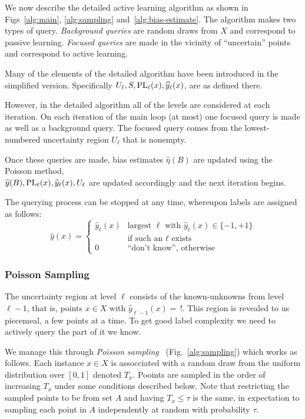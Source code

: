 \documentclass[twoside]{article}
\def\yh{{\widehat{y}}}
\def\PL{{\mbox{\rm PL}}}
\begin{document}
We now describe the detailed active learning algorithm as shown in
Figs~\ref{alg:main}, \ref{alg:sampling} and~\ref{alg:bias-estimate}.
The algorithm makes two types of query. \emph{Background queries} are random draws
from $X$ and correspond to passive learning. \emph{Focused queries}
are made in the vicinity of ``uncertain'' points and correspond to
active learning.

Many of the elements of the detailed algorithm have been introduced in the simplified version.
Specifically $U_\ell,S,\PL_\ell(x),\yh_\ell(x)$, are as defined there.

However, in the detailed algorithm all of the levels are considered at each iteration.
On each iteration of the main loop (at most) one focused
query is made as well as a background query. The focused query comes
from the lowest-numbered uncertainty region $U_\ell$ that is nonempty.

Once these queries are made, bias estimates $\widehat{\eta}(B)$ are
updated using the Poisson method,\\
$\yh(B), \PL_\ell(x), \yh_\ell(x), U_\ell$ are updated
accordingly  and the next iteration begins.

The querying process can be stopped at any time, whereupon labels are assigned as follows:
\begin{equation}
\yh(x) = 
\left\{
\begin{array}{cl}
  \yh_\ell(x) & \mbox{largest $\ell$ with $\yh_\ell(x) \in \{-1,+1\}$}\\
  & \mbox{if such an $\ell$ exists} \\
0 & \mbox{``don't know'', otherwise}
\end{array}
\right.
\label{eq:final-label}
\end{equation}

\subsubsection{Poisson Sampling}
\label{sec:poisson}


The uncertainty region at level $\ell$ consists of the known-unknowns
from level $\ell-1$, that is, points $x \in X$ with
$\yh_{\ell-1}(x) = \, !$. This region is revealed to us piecemeal, a
few points at a time. To get good label complexity we need to actively
query the part of it we know.

We manage this through \emph{Poisson
  sampling}~\cite{ghosh2002sampling} (Fig.~\ref{alg:sampling}) which
works as follows. Each instance $x \in X$ is assocciated with a random
draw from the uniform distribution over $[0,1]$ denoted $T_x$.
Pooints are sampled in the order of increasing $T_x$ under some
conditions described below.  Note that restricting the sampled points
to be from set $A$ and having $T_x \leq \tau$ is the same, in
expectation to sampling each point in $A$ independently at random with
probability $\tau$.
\end{document}
